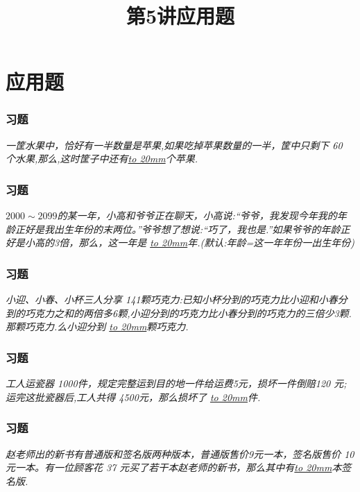 \section{应用题}

\title[第5讲\quad 应用题]{第5讲\quad 应用题} 
\author{}
\date{}

\begin{frame}
    \titlepage
\end{frame}

\setcounter{framecounter}{0}

\begin{frame}
    \frametitle{习题\theframecounter}
    \vspace*{-3cm}
    \textit{一筐水果中，恰好有一半数量是苹果,如果吃掉苹果数量的一半，筐中只剩下 60 个水果,那么,这时筐子中还有\underline{\hbox to 20mm{}}个苹果.} 
\end{frame}


\begin{frame}
    \frametitle{习题\theframecounter}
    \vspace*{-3cm}
    \textit{$2000\sim 2099$的某一年，小高和爷爷正在聊天，小高说:“爷爷，我发现今年我的年龄正好是我出生年份的末两位。”爷爷想了想说:“巧了，我也是.”如果爷爷的年龄正好是小高的3倍，那么，这一年是  \underline{\hbox to 20mm{}}年.(默认:年龄=这一年年份一出生年份)} 
\end{frame}


\begin{frame}
    \frametitle{习题\theframecounter}
    \vspace*{-3cm}
    \textit{小迎、小春、小杯三人分享 141颗巧克力:已知小杯分到的巧克力比小迎和小春分到的巧克力之和的两倍多6颗,小迎分到的巧克力比小春分到的巧克力的三倍少3颗.那颗巧克力.么小迎分到  \underline{\hbox to 20mm{}}颗巧克力.} 
\end{frame}

\begin{frame}
    \frametitle{习题\theframecounter}
    \vspace*{-3cm}
    \textit{工人运瓷器 1000件，规定完整运到目的地一件给运费5元，损坏一件倒赔120 元;运完这批瓷器后,工人共得 4500元，那么损坏了 \underline{\hbox to 20mm{}}件.} 
\end{frame}

\begin{frame}
    \frametitle{习题\theframecounter}
    \vspace*{-3cm}
    \textit{赵老师出的新书有普通版和签名版两种版本，普通版售价9元一本，签名版售价 10 元一本。有一位顾客花 37 元买了若干本赵老师的新书，那么其中有\underline{\hbox to 20mm{}}本签名版.} 
\end{frame}

